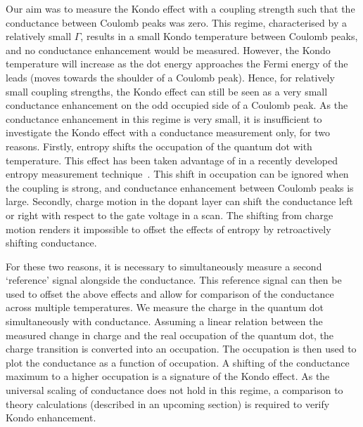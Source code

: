 Our aim was to measure the Kondo effect with a coupling strength such that the conductance between Coulomb peaks was zero. This regime, characterised by a relatively small $\Gamma$, results in a small Kondo temperature between Coulomb peaks, and no conductance enhancement would be measured. However, the Kondo temperature will increase as the dot energy approaches the Fermi energy of the leads (moves towards the shoulder of a Coulomb peak). Hence, for relatively small coupling strengths, the Kondo effect can still be seen as a very small conductance enhancement on the odd occupied side of a Coulomb peak. As the conductance enhancement in this regime is very small, it is insufficient to investigate the Kondo effect with a conductance measurement only, for two reasons. Firstly, entropy shifts the occupation of the quantum dot with temperature. This effect has been taken advantage of in a recently developed entropy measurement technique~\cite{hartman, child_strong, child_meas}. This shift in occupation can be ignored when the coupling is strong, and conductance enhancement between Coulomb peaks is large. Secondly, charge motion in the dopant layer can shift the conductance left or right with respect to the gate voltage in a scan. The shifting from charge motion renders it impossible to offset the effects of entropy by retroactively shifting conductance. 

For these two reasons, it is necessary to simultaneously measure a second `reference' signal alongside the conductance. This reference signal can then be used to offset the above effects and allow for comparison of the conductance across multiple temperatures. We measure the charge in the quantum dot simultaneously with conductance. Assuming a linear relation between the measured change in charge and the real occupation of the quantum dot, the charge transition is converted into an occupation. The occupation is then used to plot the conductance as a function of occupation. A shifting of the conductance maximum to a higher occupation is a signature of the Kondo effect. 
As the universal scaling of conductance does not hold in this regime, a comparison to theory calculations (described in an upcoming section) is required to verify Kondo enhancement. 





